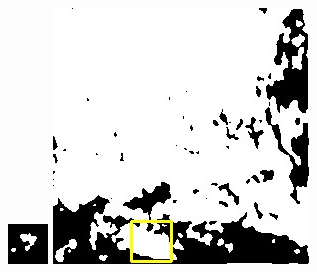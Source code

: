 \documentclass[10pt]{ctexart}
\begin{document}
\begin{multicols}{2}
\begin{figure}[H]
{\begin{minipage}[b]{0.15\linewidth}
            \includegraphics[width=1\linewidth]{../log/spoon2/cut2/tmp_cut_LC80460282014171LGN00_12434_unet.jpg}\vspace{4pt}
            \includegraphics[width=1\linewidth]{../log/spoon2/cut2/LC81620432014072LGN00_16237_unet.jpg}\vspace{4pt}

\end{minipage}}
\end{figure}
\end{multicols}
\end{document}
